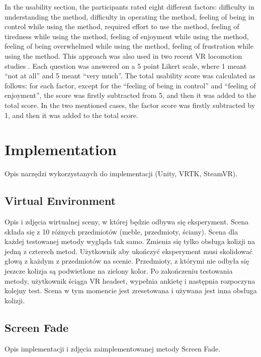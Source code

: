 In the usability section, the participants rated eight different factors: difficulty in understanding the method, difficulty in operating the method, feeling of being in control while using the method, required effort to use the method, feeling of tiredness while using the method, feeling of enjoyment while using the method, feeling of being overwhelmed while using the method, feeling of frustration while using the method. This approach was also used in two recent VR locomotion studies \cite{TELEPORTATIONSTUDY}\cite{NODEBASEDTELEPORTATION}. Each question was answered on a 5 point Likert scale, where 1 meant ``not at all'' and 5 meant ``very much''. The total usability score was calculated as follows: for each factor, except for the ``feeling of being in control'' and ``feeling of enjoyment'', the score was firstly subtracted from 5, and then it was added to the total score. In the two mentioned cases, the factor score was firstly subtracted by 1, and then it was added to the total score.

\section{Implementation}

Opis narzędzi wykorzystanych do implementacji (Unity, VRTK, SteamVR).

\subsection{Virtual Environment}

Opis i zdjęcia wirtualnej sceny, w której będzie odbywa się eksperyment. Scena składa się z 10 różnych przedmiotów (meble, przedmioty, ściany). Scena dla każdej testowanej metody wygląda tak samo. Zmienia się tylko obsługa kolizji na jedną z czterech metod. Użytkownik aby ukończyć eksperyment musi skolidować głową z każdym z przedmiotów na scenie. Przedmioty, z którymi nie odbyła się jeszcze kolizja są podwietlone na zielony kolor. Po zakończeniu testowania metody, użytkownik ściąga VR headset, wypełnia ankietę i następnia rozpoczyna kolejny test. Scena w tym momencie jest zresetowana i używana jest inna obsługa kolizji.

\subsection{Screen Fade}

Opis implementacji i zdjęcia zaimplementowanej metody Screen Fade.


